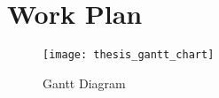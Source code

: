 \chapter{Work Plan} \label{ap1:work_plan}

\begin{figure}[h]
	\texttt{[image: thesis\_gantt\_chart]}
	\caption{Gantt Diagram}
	\label{fig:gantt}
\end{figure}
